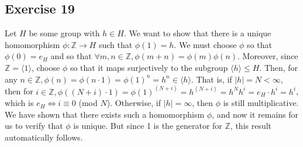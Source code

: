 \subsection*{Exercise 19}
Let $H$ be some group with $h \in H$. We want to show that there is a unique homomorphism $\phi: \mathbb{Z} \rightarrow H$ such that $\phi(1) = h$. We must choose $\phi$ so that $\phi(0) = e_H$ and so that $\forall m,n \in \mathbb{Z}, \phi(m + n) = \phi(m)\phi(n)$. Moreover, since $\mathbb{Z} = \langle1\rangle$, choose $\phi$ so that it maps surjectively to the subgroup $\langle h \rangle \le H$. Then, for any $n \in \mathbb{Z}, \phi(n) = \phi(n\cdot 1) = \phi(1)^n = h^n \in \langle h \rangle$. That is, if $|h| = N < \infty$, then for $i \in \mathbb{Z}, \phi((N+i)\cdot1) = \phi(1)^{(N+i)} = h^{(N+i)} = h^Nh^i = e_H\cdot h^i = h^i$, which is $e_H \iff i \equiv 0$ (mod $N$). Otherwise, if $|h| = \infty$, then $\phi$ is still multiplicative. We have shown that there exists such a homomorphism $\phi$, and now it remains for us to verify that $\phi$ is unique. But since 1 is the generator for $\mathbb{Z}$, this result automatically follows.